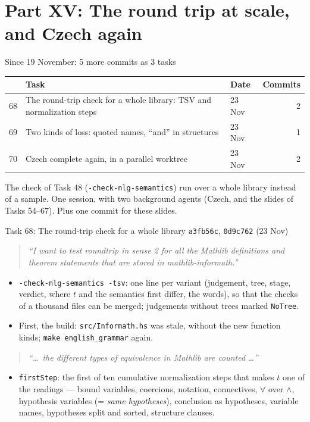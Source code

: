 \documentclass[10pt,aspectratio=169]{beamer}
\newcommand{\bad}[1]{\textcolor{warn}{#1}}
\newcommand{\commit}[1]{\texttt{\footnotesize #1}}
\newcommand{\prompt}[1]{\begin{quote}\small\itshape ``#1''\end{quote}}
\begin{document}
\section{Part XV: The round trip at scale, and Czech again}

\begin{frame}{Since 19 November: 5 more commits as 3 tasks}
  \footnotesize
  \begin{tabular}{rllr}
    \toprule
    & \textbf{Task} & \textbf{Date} & \textbf{Commits} \\
    \midrule
    68 & The round-trip check for a whole library: TSV and normalization steps & 23 Nov & 2 \\
    69 & Two kinds of loss: quoted names, ``and'' in structures & 23 Nov & 1 \\
    70 & Czech complete again, in a parallel worktree & 23 Nov & 2 \\
    \bottomrule
  \end{tabular}

  \vspace{0.5em}
  \small The check of Task 48 (\texttt{-check-nlg-semantics}) run over a whole library instead
  of a sample. One session, with two background agents (Czech, and the slides of Tasks 54--67).
  Plus one commit for these slides.
\end{frame}

\begin{frame}{Task 68: The round-trip check for a whole library}
  \commit{a3fb56c}, \commit{0d9c762} (23 Nov)
  \prompt{I want to test roundtrip in sense 2 for all the Mathlib definitions and theorem
  statements that are stored in mathlib-informath.}
  \begin{itemize}\footnotesize
    \item \texttt{-check-nlg-semantics -tsv}: one line per variant (judgement, tree, stage,
          verdict, where $t$ and the semantics first differ, the words), so that the checks of
          a thousand files can be merged; judgements without trees marked \texttt{NoTree}.
    \item First, the build: \bad{\texttt{src/Informath.hs} was stale}, without the new
          function kinds; \texttt{make english\_grammar} again.
  \end{itemize}
  \prompt{\ldots\ the different types of equivalence in Mathlib are counted \ldots}
  \begin{itemize}\footnotesize
    \item \texttt{firstStep}: the first of ten cumulative normalization steps that makes $t$ one
          of the readings --- bound variables, coercions, notation, connectives, $\forall$ over
          $\wedge$, hypothesis variables (= \emph{same hypotheses}), conclusion as hypotheses,
          variable names, hypotheses split and sorted, structure clauses.
  \end{itemize}
\end{frame}
\end{document}
